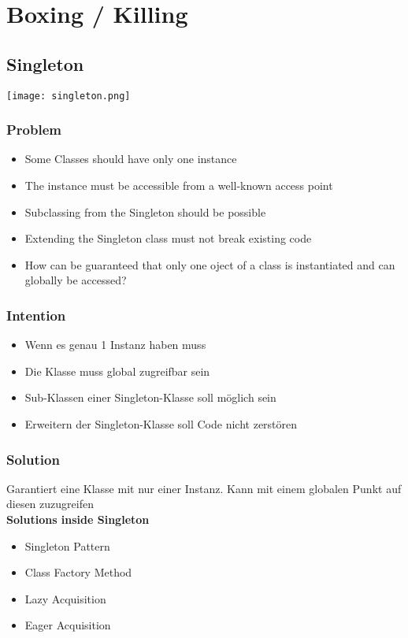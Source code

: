 \section{Boxing / Killing}
\subsection{Singleton}

\texttt{[image: singleton.png]}

\subsubsection{Problem}
\begin{itemize}
    \item Some Classes should have only one instance
    \item The instance must be accessible from a well-known access point
    \item Subclassing from the Singleton should be possible
    \item Extending the Singleton class must not break existing code
    \item How can be guaranteed that only one oject of a class is instantiated and can globally be accessed?
\end{itemize}

\subsubsection{Intention}

\begin{itemize}
    \item Wenn es genau 1 Instanz haben muss
    \item Die Klasse muss global zugreifbar sein
    \item Sub-Klassen einer Singleton-Klasse soll möglich sein
    \item Erweitern der Singleton-Klasse soll Code nicht zerstören
\end{itemize}

\subsubsection{Solution}
Garantiert eine Klasse mit nur einer Instanz. Kann mit einem globalen Punkt auf diesen zuzugreifen \\

\textbf{Solutions inside Singleton}
\begin{itemize}
    \item Singleton Pattern
    \item Class Factory Method
    \item Lazy Acquisition
    \item Eager Acquisition
\end{itemize}
